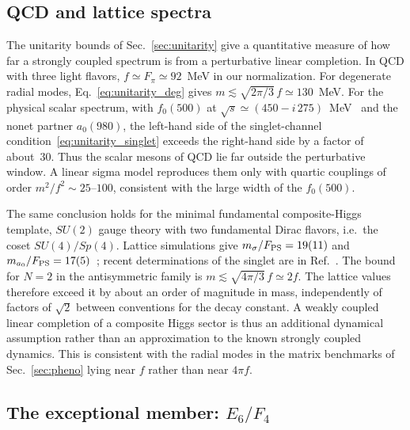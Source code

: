 \subsection{QCD and lattice spectra}
\label{add:qcd}

The unitarity bounds of Sec.~\ref{sec:unitarity} give a quantitative measure of how far a strongly coupled spectrum is from a perturbative linear completion. In QCD with three light flavors, $f\simeq F_\pi\simeq92$~MeV in our normalization. For degenerate radial modes, Eq.~\eqref{eq:unitarity_deg} gives $m\lesssim\sqrt{2\pi/3}\,f\simeq130$~MeV. For the physical scalar spectrum, with $f_0(500)$ at $\sqrt s\simeq(450-i\,275)$~MeV~\cite{Pelaez:2015qba,ParticleDataGroup:2024cfk} and the nonet partner $a_0(980)$, the left-hand side of the singlet-channel condition~\eqref{eq:unitarity_singlet} exceeds the right-hand side by a factor of about~30. Thus the scalar mesons of QCD lie far outside the perturbative window. A linear sigma model reproduces them only with quartic couplings of order $m^2/f^2\sim25$--$100$, consistent with the large width of the $f_0(500)$.

The same conclusion holds for the minimal fundamental composite-Higgs template, $SU(2)$ gauge theory with two fundamental Dirac flavors, i.e.\ the coset $SU(4)/Sp(4)$. Lattice simulations give $m_\sigma/F_{\rm PS}=19(11)$ and $m_{a_0}/F_{\rm PS}=17(5)$~\cite{Arthur:2016ozw}; recent determinations of the singlet are in Ref.~\cite{Bowes:2025sigma}. The bound for $N=2$ in the antisymmetric family is $m\lesssim\sqrt{4\pi/3}\,f\simeq2f$. The lattice values therefore exceed it by about an order of magnitude in mass, independently of factors of $\sqrt2$ between conventions for the decay constant. A weakly coupled linear completion of a composite Higgs sector is thus an additional dynamical assumption rather than an approximation to the known strongly coupled dynamics. This is consistent with the radial modes in the matrix benchmarks of Sec.~\ref{sec:pheno} lying near $f$ rather than near $4\pi f$.

\subsection{The exceptional member: $E_6/F_4$}
\label{add:e6}

